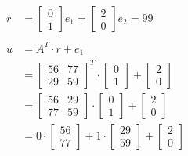 \begin{align*}
  r       & = \begin{bmatrix}0 \\ 1 \end{bmatrix}
  e_1 = \begin{bmatrix}2 \\ 0 \end{bmatrix}
  e_2 = 99                                                          \\
  \\
  u       & = A^T \cdot r + e_1                                     \\
          & = \begin{bmatrix}
                56 & 77 \\
                29 & 59
              \end{bmatrix}^T
  \cdot
  \begin{bmatrix}
    0 \\
    1
  \end{bmatrix}
  +
  \begin{bmatrix}
    2 \\
    0
  \end{bmatrix}                                                    \\
          & = \begin{bmatrix}
                56 & 29 
                \\ 77 & 59 
              \end{bmatrix}
  \cdot 
  \begin{bmatrix}
    0 \\
    1 
  \end{bmatrix}
  +
  \begin{bmatrix}
    2 \\
    0
  \end{bmatrix}                                                    \\
          & = 0\cdot
  \begin{bmatrix}
    56 \\
    77
  \end{bmatrix}
  + 1 \cdot 
  \begin{bmatrix}
    29 \\
    59
  \end{bmatrix}
  +
  \begin{bmatrix}
    2 \\
    0
  \end{bmatrix}                                                    \\

\end{align*}
